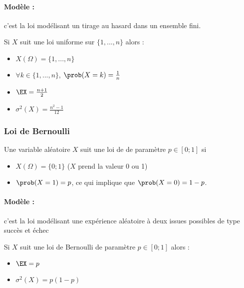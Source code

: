 	\paragraph{Modèle :} c'est la loi modélisant un tirage \og au hasard \fg{} dans un ensemble fini.
	
	\begin{proposition}{}{}
		Si $X$ suit une loi uniforme sur  $\{1,...,n\}$ alors :
		\begin{itemize}
			\item $X(\Omega)= \{1,...,n\}$
			\item $\forall k \in \{1,...,n\}$, $\prob(X=k)= \frac{1}{n}$
			\item $\EX = \frac{n+1}{2}$
			\item $\sigma^2(X)=\frac{n^2-1}{12}$
		\end{itemize}
	\end{proposition}

\subsubsection{Loi de Bernoulli}
\begin{definition}{}{}
	Une variable aléatoire $X$ suit une loi de  de paramètre $p \in [0;1]$ si 
	\begin{itemize}
		\item $X(\Omega)=\{0;1\}$ ($X$ prend la valeur 0 ou 1) 
		\item $\prob(X=1)=p$, ce qui implique que $\prob(X=0)=1-p$.
		\end{itemize}
\end{definition}
		
		\paragraph{Modèle :} c'est la loi modélisant une expérience aléatoire à deux issues possibles de type \og succès \fg{} et \og échec \fg{}
	
								
	\begin{proposition}{}{}
		Si $X$ suit une loi de Bernoulli de paramètre $p \in [0;1]$ alors :
		\begin{itemize}
				\item $\EX = p$
				\item $\sigma^2(X)=p(1-p)$
		\end{itemize}
	\end{proposition}
	

